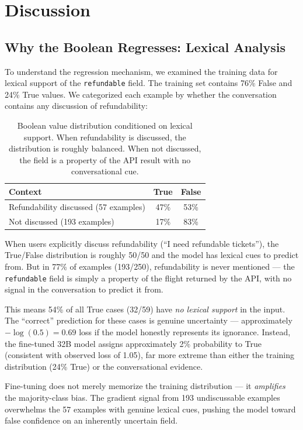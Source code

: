 \documentclass[11pt]{article}
\begin{document}
\section{Discussion}

\subsection{Why the Boolean Regresses: Lexical Analysis}

To understand the regression mechanism, we examined the training data for lexical support of the \texttt{refundable} field. The training set contains 76\% False and 24\% True values. We categorized each example by whether the conversation contains any discussion of refundability:

\begin{table}[h]
\centering
\small
\begin{tabular}{lcc}
\toprule
\textbf{Context} & \textbf{True} & \textbf{False} \\
\midrule
Refundability discussed (57 examples) & 47\% & 53\% \\
Not discussed (193 examples) & 17\% & 83\% \\
\bottomrule
\end{tabular}
\caption{Boolean value distribution conditioned on lexical support. When refundability is discussed, the distribution is roughly balanced. When not discussed, the field is a property of the API result with no conversational cue.}
\label{tab:lexical}
\end{table}

When users explicitly discuss refundability (``I need refundable tickets''), the True/False distribution is roughly 50/50 and the model has lexical cues to predict from. But in 77\% of examples (193/250), refundability is never mentioned --- the \texttt{refundable} field is simply a property of the flight returned by the API, with no signal in the conversation to predict it from.

This means 54\% of all True cases (32/59) have \emph{no lexical support} in the input. The ``correct'' prediction for these cases is genuine uncertainty --- approximately $-\log(0.5) = 0.69$ loss if the model honestly represents its ignorance. Instead, the fine-tuned 32B model assigns approximately 2\% probability to True (consistent with observed loss of 1.05), far more extreme than either the training distribution (24\% True) or the conversational evidence.

Fine-tuning does not merely memorize the training distribution --- it \emph{amplifies} the majority-class bias. The gradient signal from 193 undiscussable examples overwhelms the 57 examples with genuine lexical cues, pushing the model toward false confidence on an inherently uncertain field.
\end{document}
